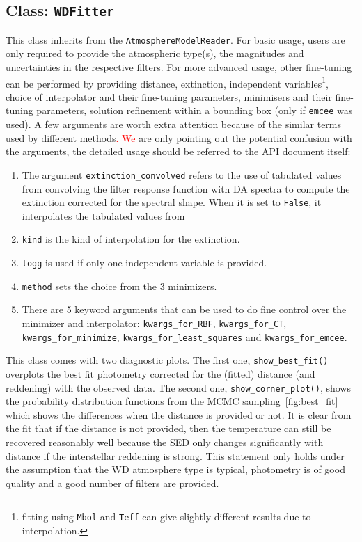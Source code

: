 \documentclass[fleqn,usenatbib]{rasti}
\begin{document}
\subsection{Class: \texttt{WDFitter}}
\label{sec:wdfitter}
This class inherits from the \verb+AtmosphereModelReader+. For basic usage,
users are only required to provide the atmospheric type(s), the magnitudes and
uncertainties in the respective filters. For more advanced usage, other
fine-tuning can be performed by providing distance, extinction, independent
variables\footnote{fitting using \texttt{Mbol} and \texttt{Teff} can give slightly
different results due to interpolation.}, choice of interpolator and their
fine-tuning parameters, minimisers and their fine-tuning parameters,
solution refinement within a bounding box (only if \verb+emcee+ was used).
A few arguments are worth extra attention because of the similar terms used
by different methods\textcolor{red}{. We} are only pointing out the potential confusion with
the arguments, the detailed usage should be referred to the API document
itself:
\begin{enumerate}
    \item The argument \verb+extinction_convolved+ refers to the use of
    tabulated values from convolving the filter response function with DA
    spectra to compute the extinction corrected for the spectral shape.
    When it is set to \verb+False+, it interpolates the tabulated values
    from \citet{2011ApJ...737..103S}
    \item \verb+kind+ is the kind of interpolation for the extinction.
    \item \verb+logg+ is used if only one independent variable is
    provided.
    \item \verb+method+ sets the choice from the 3 minimizers.
    \item There are 5 keyword arguments that can be used to do fine 
    control over the minimizer and interpolator: \verb+kwargs_for_RBF+,
    \verb+kwargs_for_CT+, \verb+kwargs_for_minimize+,
    \verb+kwargs_for_least_squares+ and \verb+kwargs_for_emcee+.
\end{enumerate}

This class comes with two diagnostic plots. The first one,
\verb+show_best_fit()+ overplots the best fit photometry corrected for the
(fitted) distance (and reddening) with the observed
data. The second one, \verb+show_corner_plot()+,
shows the probability distribution functions from the MCMC
sampling~\ref{fig:best_fit} which shows the differences when the distance
is provided or not. It is clear from the fit that if the distance is not
provided, then the temperature can still be recovered reasonably well because
the SED only changes significantly with distance if the interstellar
reddening is strong. This statement only holds under the assumption that
the WD atmosphere type is typical, photometry is of good quality and a
good number of filters are provided.
\end{document}
